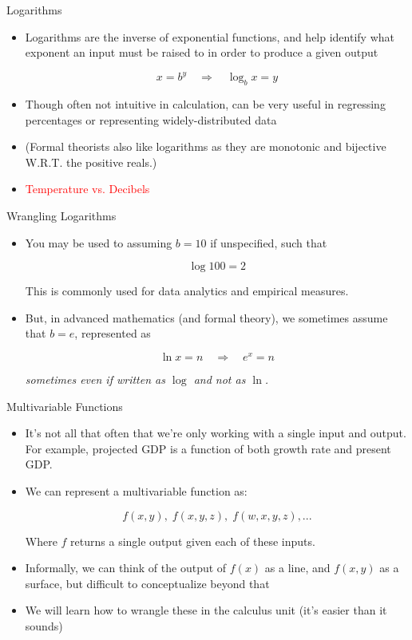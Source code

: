 \documentclass[10pt]{beamer}
\begin{document}
\begin{frame}{Logarithms}
\begin{itemize}
    \item Logarithms are the inverse of exponential functions, and help identify what exponent an input must be raised to in order to produce a given output

    \[x = b^y \quad \Rightarrow \quad \log_bx = y\]

    \item Though often not intuitive in calculation, can be very useful in regressing percentages or representing widely-distributed data

    \item (Formal theorists also like logarithms as they are monotonic and bijective W.R.T. the positive reals.)

    \item \textcolor{red}{Temperature vs. Decibels}
    
\end{itemize}
\end{frame}

\begin{frame}{Wrangling Logarithms}
    \begin{itemize}
   \item You may be used to assuming $b = 10$ if unspecified, such that

    \[\log 100 = 2\]

    This is commonly used for data analytics and empirical measures.

    \item But, in advanced mathematics (and formal theory), we sometimes assume that $b = e$, represented as

    \[\ln x = n \quad \Rightarrow \quad e^x = n\]

    \textit{sometimes even if written as $\log$ and not as $\ln$.}
    \end{itemize}
\end{frame}

\begin{frame}{Multivariable Functions}
\begin{itemize}
    \item It's not all that often that we're only working with a single input and output. For example, projected GDP is a function of both growth rate and present GDP.

    \item We can represent a multivariable function as:

    \[f(x,y), \; f(x,y,z), \; f(w,x,y,z),...\]

    Where $f$ returns a single output given each of these inputs. \pause

    \item Informally, we can think of the output of $f(x)$ as a line, and $f(x,y)$ as a surface, but difficult to conceptualize beyond that
    \item We will learn how to wrangle these in the calculus unit (it's easier than it sounds)
\end{itemize}
\end{frame}
\end{document}
